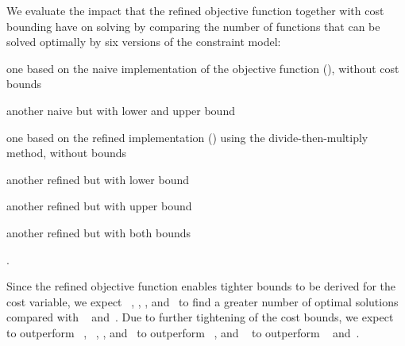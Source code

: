 We evaluate the impact that the refined \gls{objective function} together with
cost bounding have on solving by comparing the number of \glspl{function} that
can be solved optimally by six versions of the \gls{constraint model}:
%
\begin{modelList}
  \item {}
    one based on the naive implementation of the \gls{objective function}
    (), without cost bounds
  \item {}
    another naive  but with lower and upper bound
  \item {}
    one based on the refined implementation
    () using the
    \gls{divide-then-multiply method}, without bounds
  \item {}
    another refined  but with lower bound
  \item {}
    another refined  but with upper bound
  \item {}
    another refined  but with both bounds
\end{modelList}.

Since the refined \gls{objective function} enables tighter bounds to be derived
for the \gls{cost variable}, we expect ~, ,
, and~ to find a
greater number of optimal \glspl{solution} compared with ~ and~.
%
Due to further tightening of the cost bounds, we expect ~ to outperform ~, ~, ,
and~ to outperform ~, and ~ to outperform ~ and~.



